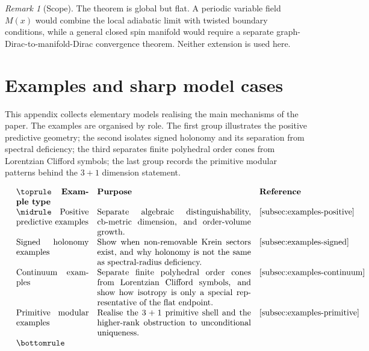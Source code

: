 \documentclass[11pt]{article}
\theoremstyle{definition}
\theoremstyle{remark}
\newtheorem{remark}[theorem]{Remark}
\begin{document}
\begin{remark}[Scope]
\label{rem:marked-torus-scope}
The theorem is global but flat.  A periodic variable field \(M(x)\) would combine
the local adiabatic limit with twisted boundary conditions, while a general
closed spin manifold would require a separate graph-Dirac-to-manifold-Dirac
convergence theorem.  Neither extension is used here.
\end{remark}


\section{Examples and sharp model cases}
\label{sec:examples}

This appendix collects elementary models realising the main mechanisms of the
paper.  The examples are organised by role.  The first group illustrates the
positive predictive geometry; the second isolates signed holonomy and its
separation from spectral deficiency; the third separates finite polyhedral order
cones from Lorentzian Clifford symbols; the last group records the primitive
modular patterns behind the \(3+1\) dimension statement.

\[
\begin{array}{p{0.25\linewidth}p{0.53\linewidth}p{0.13\linewidth}}
\toprule
\textbf{Example type} & \textbf{Purpose} & \textbf{Reference} \\
\midrule
Positive predictive examples &
Separate algebraic distinguishability, cb-metric dimension, and order-volume
growth. &
\Cref{subsec:examples-positive} \\[2pt]

Signed holonomy examples &
Show when non-removable Krein sectors exist, and why holonomy is not the same as
spectral-radius deficiency. &
\Cref{subsec:examples-signed} \\[2pt]

Continuum examples &
Separate finite polyhedral order cones from Lorentzian Clifford symbols, and
show how isotropy is only a special representative of the flat endpoint. &
\Cref{subsec:examples-continuum} \\[2pt]

Primitive modular examples &
Realise the \(3+1\) primitive shell and the higher-rank obstruction to
unconditional uniqueness. &
\Cref{subsec:examples-primitive} \\
\bottomrule
\end{array}
\]
\end{document}
